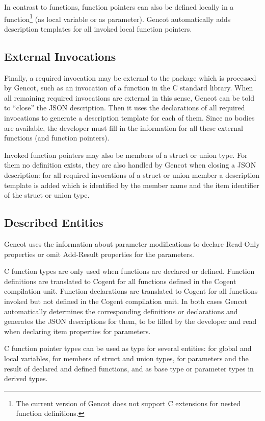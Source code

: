 In contrast to functions, function pointers can also be defined locally in a function\footnote{The current version of
Gencot does not support C extensions for nested function definitions.} (as local variable or as parameter). Gencot
automatically adds description templates for all invoked local function pointers.

\subsection{External Invocations}

Finally, a required invocation may be external to the package which is processed by Gencot, such as an invocation of
a function in the C standard library. When all remaining required invocations are external in this sense, Gencot
can be told to ``close'' the JSON description. Then it uses the declarations of all required invocations to generate
a description template for each of them. Since no bodies are available, the developer must fill in the information
for all these external functions (and function pointers).

Invoked function pointers may also be members of a struct or union type. For them no definition exists, they are also 
handled by Gencot when closing a JSON description: for all required invocations of a struct or union member a 
description template is added which is identified by the member name and the item identifier of the struct or union type.
 
\subsection{Described Entities}

Gencot uses the information about parameter modifications to declare Read-Only properties or omit Add-Result properties
for the parameters. 

C function types are only used when functions are declared or defined. Function definitions are translated to
Cogent for all functions defined in the Cogent compilation unit. Function declarations are translated to Cogent
for all functions invoked but not defined in the Cogent compilation unit. In both cases Gencot automatically 
determines the corresponding definitions or declarations and generates the JSON descriptions for them, to be
filled by the developer and read when declaring item properties for parameters.

C function pointer types can be used as type for several entities: for global and local variables, for members of struct
and union types, for parameters and the result of declared and defined functions, and as base type or parameter 
types in derived types.

